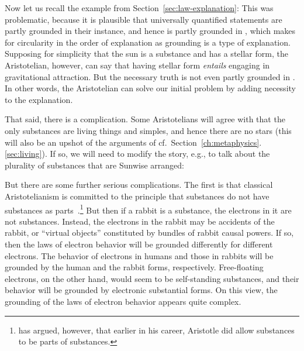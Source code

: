 Now let us recall the example from Section~\ref{sec:law-explanation}:
This was problematic, because it is plausible that universally quantified statements are partly grounded in their
instance, and hence  is partly grounded in , which makes for circularity in the order
of explanation as grounding is a type of explanation. Supposing for simplicity that the sun is a substance and
has a stellar form, the Aristotelian, however, can say that having stellar form \textit{entails} engaging in
gravitational attraction.
But the necessary truth  is not even partly grounded in . In other words, the Aristotelian
can solve our initial problem by adding necessity to the explanation.

That said, there is a complication. Some Aristotelians will agree with  that
the only substances are living things and simples, and hence there are no stars (this will also be an upshot
of the arguments of cf.\ Section~\ref{ch:metaphysics}.\ref{sec:living}). If so, we will need to modify the story, e.g., to talk about the plurality of
substances that are Sunwise arranged:

But there are some further serious complications. The first is that classical Aristotelianism is committed to the principle that 
substances do not have substances as parts~\cite[VII.16]{AristotleMet}.\footnote{ has argued,
however, that earlier in his career, Aristotle did allow substances to be parts of substances.} But then if a rabbit is a substance, the electrons in
it are not substances. Instead, the electrons in the rabbit may be accidents of the rabbit, or ``virtual objects'' 
constituted by bundles of rabbit causal powers. If so, then the laws of electron behavior will be grounded differently
for different electrons. The behavior of electrons in humans and those in rabbits will be grounded by the human and the 
rabbit forms, respectively. Free-floating electrons, on the other hand, would seem to be self-standing substances, and
their behavior will be grounded by electronic substantial forms. On this view, the grounding of the laws of electron 
behavior appears quite complex.

